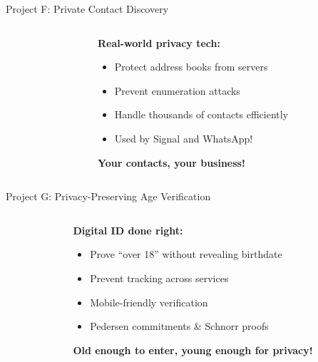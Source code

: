 \documentclass[aspectratio=169, lualatex, handout]{beamer}
\begin{document}
\begin{frame}{Project F: Private Contact Discovery}
	\begin{columns}[c]
		\begin{column}{0.5\textwidth}
		\end{column}
		\begin{column}{0.5\textwidth}
			\textbf{Real-world privacy tech:}
			\begin{itemize}[<+->]
				\item Protect address books from servers
				\item Prevent enumeration attacks
				\item Handle thousands of contacts efficiently
				\item Used by Signal and WhatsApp!
			\end{itemize}
			\vspace{0.5cm}
			\textcolor{cipherprimary}{\textbf{Your contacts, your business!}}
		\end{column}
	\end{columns}
\end{frame}

\begin{frame}{Project G: Privacy-Preserving Age Verification}
	\begin{columns}[c]
		\begin{column}{0.5\textwidth}
		\end{column}
		\begin{column}{0.5\textwidth}
			\textbf{Digital ID done right:}
			\begin{itemize}[<+->]
				\item Prove ``over 18'' without revealing birthdate
				\item Prevent tracking across services
				\item Mobile-friendly verification
				\item Pedersen commitments \& Schnorr proofs
			\end{itemize}
			\vspace{0.5cm}
			\textcolor{cipherprimary}{\textbf{Old enough to enter, young enough for privacy!}}
		\end{column}
	\end{columns}
\end{frame}
\end{document}
